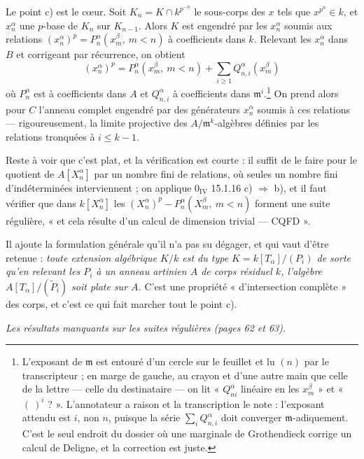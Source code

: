 \documentclass[11pt,a4paper]{article}
\begin{document}
Le point c) est le cœur. Soit $K_{n} = K \cap k^{p^{-n}}$ le sous-corps des $x$
tels que $x^{p^{n}} \in k$, et $x_{n}^{\alpha}$ une $p$-base de $K_{n}$ sur
$K_{n-1}$. Alors $K$ est engendré par les $x_{n}^{\alpha}$ soumis aux relations
$(x_{n}^{\alpha})^{p} = P_{n}^{\alpha}(x_{m}^{\beta},\ m < n)$ à coefficients
dans $k$. Relevant les $x_{n}^{\alpha}$ dans $B$ et corrigeant par récurrence,
on obtient
\[
  \boxed{\;(x_{n}^{\alpha})^{p} = P_{n}^{\alpha}(x_{m}^{\beta},\ m < n)
  + \sum_{i \geqslant 1} Q_{n,i}^{\alpha}(x_{m}^{\beta}) \;}
\]
où $P_{n}^{\alpha}$ est à coefficients dans $A$ et $Q_{n,i}^{\alpha}$ à
coefficients dans $\mathfrak{m}^{i}$.\footnote{L'exposant de $\mathfrak{m}$ est
entouré d'un cercle sur le feuillet et lu $(n)$ par le transcripteur ; en marge
de gauche, au crayon et d'une autre main que celle de la lettre — celle du
destinataire — on lit « $Q_{n i}^{\alpha}$ linéaire en les $x_{m}^{\beta}$ » et
« $(\ )^{i}$ ? ». L'annotateur a raison et la transcription le note : l'exposant
attendu est $i$, non $n$, puisque la série $\sum_{i} Q_{n,i}^{\alpha}$ doit
converger $\mathfrak{m}$-adiquement. C'est le seul endroit du dossier où une
marginale de Grothendieck corrige un calcul de Deligne, et la correction est
juste.} On prend alors pour $C$ l'anneau complet engendré par des générateurs
$x_{n}^{\alpha}$ soumis à ces relations — rigoureusement, la limite projective
des $A/\mathfrak{m}^{k}$-algèbres définies par les relations tronquées à $i
\leqslant k-1$.

Reste à voir que c'est plat, et la vérification est courte : il suffit de le
faire pour le quotient de $A[X_{n}^{\alpha}]$ par un nombre fini de relations,
où seules un nombre fini d'indéterminées interviennent ; on applique
$0_{\mathrm{IV}}$ 15.1.16 c) $\Rightarrow$ b), et il faut vérifier que dans
$k[X_{n}^{\alpha}]$ les $(X_{n}^{\alpha})^{p} -
P_{n}^{\alpha}(X_{m}^{\beta},\ m<n)$ forment une suite régulière, « et cela
résulte d'un calcul de dimension trivial — CQFD ».

Il ajoute la formulation générale qu'il n'a pas su dégager, et qui vaut d'être
retenue : \emph{toute extension algébrique $K/k$ est du type $K =
k[T_{\alpha}]/(P_{i})$ de sorte qu'en relevant les $P_{i}$ à un anneau artinien
$A$ de corps résiduel $k$, l'algèbre $A[T_{\alpha}]/(\widetilde{P}_{i})$ soit
plate sur $A$.} C'est une propriété « d'intersection complète » des corps, et
c'est ce qui fait marcher tout le point c).

\emph{Les résultats manquants sur les suites régulières (pages 62 et 63).}
\end{document}
